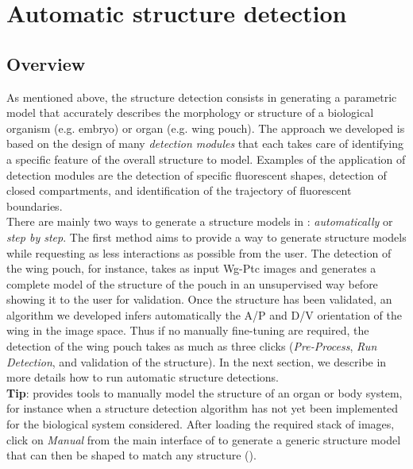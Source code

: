 \section{Automatic structure detection}\label{sec:structure_automatic}
\subsection{Overview}
As mentioned above, the structure detection consists in generating a parametric model that accurately describes the morphology or structure of a biological organism (e.g. \droso embryo) or organ (e.g. \droso wing pouch). The approach we developed is based on the design of many \textit{detection modules} that each takes care of identifying a specific feature of the overall structure to model\autocite{schaffter2013}. Examples of the application of detection modules are the detection of specific fluorescent shapes, detection of closed compartments, and identification of the trajectory of fluorescent boundaries.\\

There are mainly two ways to generate a structure models in \wingj: \textit{automatically} or \textit{step by step}. The first method aims to provide a way to generate structure models while requesting as less interactions as possible from the user. The detection of the \droso wing pouch, for instance, takes as input Wg-Ptc images and generates a complete model of the structure of the pouch in an unsupervised way before showing it to the user for validation. Once the structure has been validated, an algorithm we developed infers automatically the A/P and D/V orientation of the wing in the image space. Thus if no manually fine-tuning are required, the detection of the wing pouch takes as much as three clicks (\textit{Pre-Process}, \textit{Run Detection}, and validation of the structure). In the next section, we describe in more details how to run automatic structure detections.\\

\textbf{Tip}: \wingj provides tools to manually model the structure of an organ or body system, for instance when a structure detection algorithm has not yet been implemented for the biological system considered. After loading the required stack of images, click on \textit{Manual} from the main interface of \wingj to generate a generic structure model that can then be shaped to match any structure ().

